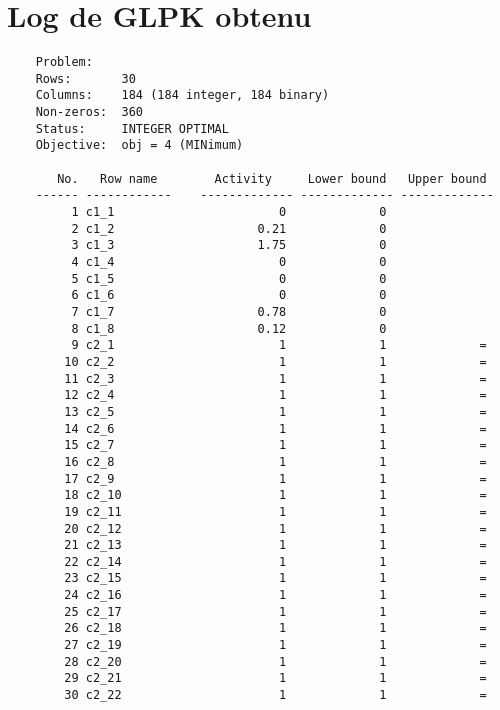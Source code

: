\documentclass{article}[A4]
\begin{document}
\section{Log de GLPK obtenu}
\begin{verbatim}
	Problem:    
	Rows:       30
	Columns:    184 (184 integer, 184 binary)
	Non-zeros:  360
	Status:     INTEGER OPTIMAL
	Objective:  obj = 4 (MINimum)
	
	   No.   Row name        Activity     Lower bound   Upper bound
	------ ------------    ------------- ------------- -------------
	     1 c1_1                       0             0               
	     2 c1_2                    0.21             0               
	     3 c1_3                    1.75             0               
	     4 c1_4                       0             0               
	     5 c1_5                       0             0               
	     6 c1_6                       0             0               
	     7 c1_7                    0.78             0               
	     8 c1_8                    0.12             0               
	     9 c2_1                       1             1             = 
	    10 c2_2                       1             1             = 
	    11 c2_3                       1             1             = 
	    12 c2_4                       1             1             = 
	    13 c2_5                       1             1             = 
	    14 c2_6                       1             1             = 
	    15 c2_7                       1             1             = 
	    16 c2_8                       1             1             = 
	    17 c2_9                       1             1             = 
	    18 c2_10                      1             1             = 
	    19 c2_11                      1             1             = 
	    20 c2_12                      1             1             = 
	    21 c2_13                      1             1             = 
	    22 c2_14                      1             1             = 
	    23 c2_15                      1             1             = 
	    24 c2_16                      1             1             = 
	    25 c2_17                      1             1             = 
	    26 c2_18                      1             1             = 
	    27 c2_19                      1             1             = 
	    28 c2_20                      1             1             = 
	    29 c2_21                      1             1             = 
	    30 c2_22                      1             1             = 
	

\end{verbatim}
\end{document}
